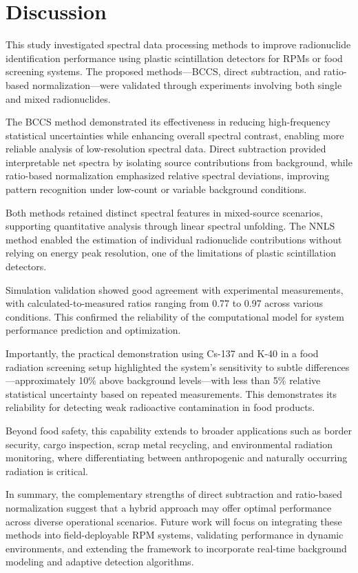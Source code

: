 \documentclass[10pt]{wlscirep}
\begin{document}
\section*{Discussion}

This study investigated spectral data processing methods to improve radionuclide identification performance using plastic scintillation detectors for RPMs or food screening systems. The proposed methods—BCCS, direct subtraction, and ratio-based normalization—were validated through experiments involving both single and mixed radionuclides.

The BCCS method demonstrated its effectiveness in reducing high-frequency statistical uncertainties while enhancing overall spectral contrast, enabling more reliable analysis of low-resolution spectral data. Direct subtraction provided interpretable net spectra by isolating source contributions from background, while ratio-based normalization emphasized relative spectral deviations, improving pattern recognition under low-count or variable background conditions.

Both methods retained distinct spectral features in mixed-source scenarios, supporting quantitative analysis through linear spectral unfolding. The NNLS method enabled the estimation of individual radionuclide contributions without relying on energy peak resolution, one of the limitations of plastic scintillation detectors.

Simulation validation showed good agreement with experimental measurements, with calculated-to-measured ratios ranging from 0.77 to 0.97 across various conditions. This confirmed the reliability of the computational model for system performance prediction and optimization.

Importantly, the practical demonstration using Cs-137 and K-40 in a food radiation screening setup highlighted the system's sensitivity to subtle differences—approximately 10\% above background levels—with less than 5\% relative statistical uncertainty based on repeated measurements. This demonstrates its reliability for detecting weak radioactive contamination in food products.

Beyond food safety, this capability extends to broader applications such as border security, cargo inspection, scrap metal recycling, and environmental radiation monitoring, where differentiating between anthropogenic and naturally occurring radiation is critical.

In summary, the complementary strengths of direct subtraction and ratio-based normalization suggest that a hybrid approach may offer optimal performance across diverse operational scenarios. Future work will focus on integrating these methods into field-deployable RPM systems, validating performance in dynamic environments, and extending the framework to incorporate real-time background modeling and adaptive detection algorithms.
\end{document}
